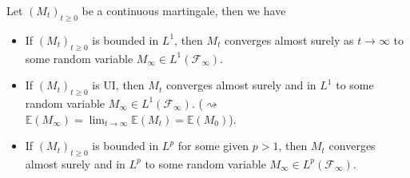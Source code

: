 \documentclass[../mainfile.tex]{subfiles}
\begin{document}
\begin{prop} Let $(M_t)_{t \geq 0}$ be a continuous martingale, then we have
\begin{itemize}
\item If $(M_t)_{t \geq 0}$ is bounded in $L^1$,  then $M_t$ converges almost surely as $t \to \infty$ to some random variable $M_\infty \in L^1 ( \mathcal{F}_\infty)$. 
\item If $(M_t)_{t \geq 0}$ is UI, then $M_t$ converges almost surely and in $L^1$ to some random variable $M_\infty \in L^1( \mathcal{F}_\infty)$. ($\rightsquigarrow$ $\mathbb{E}(M_\infty) = \lim_{t \to \infty} \mathbb{E}(M_t)=\mathbb{E}(M_0)$).
\item If $(M_t)_{t \geq 0}$ is bounded in $L^p$ for some given $p>1$, then $M_t$ converges almost surely and in $L^p$ to some random variable $M_\infty \in L^p( \mathcal{F}_\infty)$. 
\end{itemize}
\end{prop}
\newpage
\end{document}
